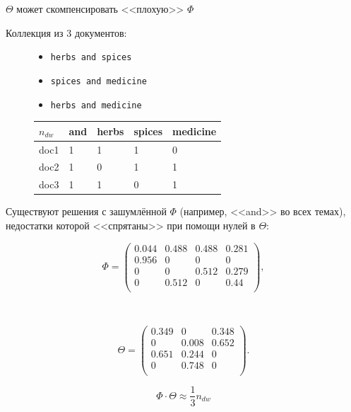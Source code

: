 \begin{frame}[t]{$\Theta$ может скомпенсировать <<плохую>> $\Phi$}

Коллекция из 3 документов: 
\begin{figure}[t]
\begin{minipage}[t]{0.4\textwidth}
	\medskip
\begin{itemize}
    \item \texttt{herbs and spices}
    \item \texttt{spices and medicine}
    \item \texttt{herbs and medicine}
\end{itemize}
	\end{minipage}
	\begin{minipage}[t]{0.4\textwidth}
\begin{center}
\begin{tabular}{l|llll}
$n_{dw}$   & and & herbs & spices & medicine \\ \hline
doc1       & 1   & 1     & 1      & 0        \\
doc2       & 1   & 0     & 1      & 1        \\
doc3       & 1   & 1     & 0      & 1      
\end{tabular}
\end{center}

\end{minipage}
\end{figure}

Существуют решения с зашумлённой $\Phi$ (например, <<and>> во всех темах), недостатки которой  <<спрятаны>>  при помощи нулей в $\Theta$:
\small
\begin{minipage}[t]{0.4\textwidth}
\[
\Phi =
\begin{pmatrix}
0.044 & 0.488 & 0.488 & 0.281 \\
0.956 & 0     & 0     & 0     \\
0     & 0     & 0.512 & 0.279 \\
0     & 0.512 & 0     & 0.44  \\
\end{pmatrix},
\]
	\end{minipage}
	$\qquad\quad$
	\begin{minipage}[t]{0.4\textwidth}
\[
\Theta =
\begin{pmatrix}
0.349 & 0     & 0.348 \\
0     & 0.008 & 0.652 \\
0.651 & 0.244 & 0     \\
0     & 0.748 & 0     \\
\end{pmatrix}.
\]
\end{minipage}
\bigskip
\[
\Phi \cdot \Theta \approx \frac{1}{3} n_{dw}
\]
\normalsize
\end{frame}

